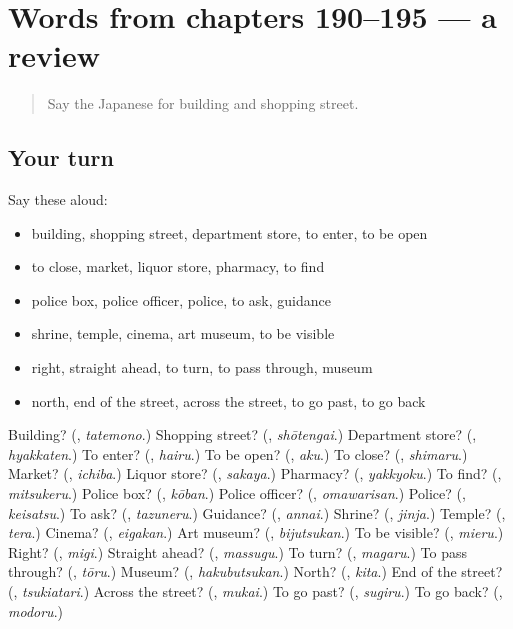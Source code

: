 \section[(dialogue)]{Words from chapters 190–195 — a review}

\label{lesson:JA-R195-review-190-195}



\begin{quote}
Say the Japanese for building and shopping street.
\end{quote}

\subsection*{Your turn}
Say these aloud:

\begin{itemize}
\raggedright
  \item building, shopping street, department store, to enter, to be open
  \item to close, market, liquor store, pharmacy, to find
  \item police box, police officer, police, to ask, guidance
  \item shrine, temple, cinema, art museum, to be visible
  \item right, straight ahead, to turn, to pass through, museum
  \item north, end of the street, across the street, to go past, to go back
\end{itemize}

\begin{tcolorbox}[breakable,colback=teal!4,colframe=teal!35!black,title={Before you move on}]
Building? (\textbf{}, \emph{tatemono}.) Shopping street? (\textbf{}, \emph{shōtengai}.) Department store? (\textbf{}, \emph{hyakkaten}.) To enter? (\textbf{}, \emph{hairu}.) To be open? (\textbf{}, \emph{aku}.) To close? (\textbf{}, \emph{shimaru}.) Market? (\textbf{}, \emph{ichiba}.) Liquor store? (\textbf{}, \emph{sakaya}.) Pharmacy? (\textbf{}, \emph{yakkyoku}.) To find? (\textbf{}, \emph{mitsukeru}.) Police box? (\textbf{}, \emph{kōban}.) Police officer? (\textbf{}, \emph{omawarisan}.) Police? (\textbf{}, \emph{keisatsu}.) To ask? (\textbf{}, \emph{tazuneru}.) Guidance? (\textbf{}, \emph{annai}.) Shrine? (\textbf{}, \emph{jinja}.) Temple? (\textbf{}, \emph{tera}.) Cinema? (\textbf{}, \emph{eigakan}.) Art museum? (\textbf{}, \emph{bijutsukan}.) To be visible? (\textbf{}, \emph{mieru}.) Right? (\textbf{}, \emph{migi}.) Straight ahead? (\textbf{}, \emph{massugu}.) To turn? (\textbf{}, \emph{magaru}.) To pass through? (\textbf{}, \emph{tōru}.) Museum? (\textbf{}, \emph{hakubutsukan}.) North? (\textbf{}, \emph{kita}.) End of the street? (\textbf{}, \emph{tsukiatari}.) Across the street? (\textbf{}, \emph{mukai}.) To go past? (\textbf{}, \emph{sugiru}.) To go back? (\textbf{}, \emph{modoru}.)
\end{tcolorbox}
